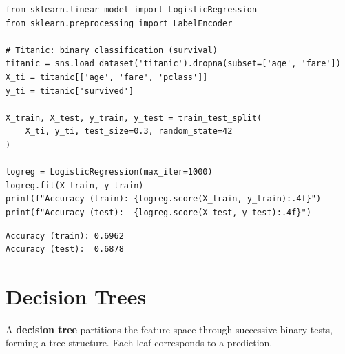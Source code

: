 \begin{codeblock}[title=\textbf{Python}]
\begin{verbatim}
from sklearn.linear_model import LogisticRegression
from sklearn.preprocessing import LabelEncoder

# Titanic: binary classification (survival)
titanic = sns.load_dataset('titanic').dropna(subset=['age', 'fare'])
X_ti = titanic[['age', 'fare', 'pclass']]
y_ti = titanic['survived']

X_train, X_test, y_train, y_test = train_test_split(
    X_ti, y_ti, test_size=0.3, random_state=42
)

logreg = LogisticRegression(max_iter=1000)
logreg.fit(X_train, y_train)
print(f"Accuracy (train): {logreg.score(X_train, y_train):.4f}")
print(f"Accuracy (test):  {logreg.score(X_test, y_test):.4f}")
\end{verbatim}
\end{codeblock}

\begin{codeoutput}
\begin{verbatim}
Accuracy (train): 0.6962
Accuracy (test):  0.6878
\end{verbatim}
\end{codeoutput}

\section{Decision Trees}
\label{sec:arbres_decision}


\begin{definition}
A \textbf{decision tree} partitions the feature space through successive binary tests, forming a tree structure. Each leaf corresponds to a prediction.
\end{definition}

\begin{center}
\end{center}

